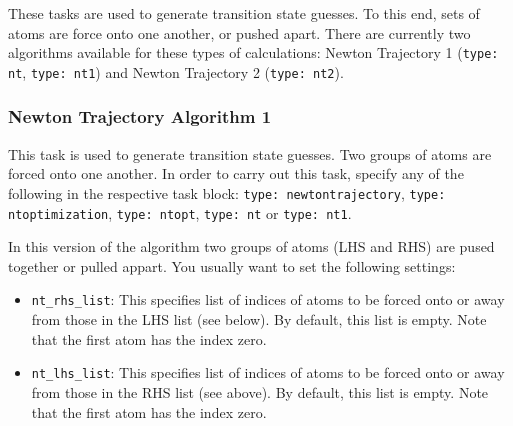 \documentclass[]{tufte-book}
\begin{document}
These tasks are used to generate transition state guesses.
To this end, sets of atoms are force onto one another, or pushed apart.
There are currently two algorithms available for these types of calculations:
Newton Trajectory 1 (\texttt{type: nt}, \texttt{type: nt1}) and Newton Trajectory 2 (\texttt{type: nt2}).

\subsubsection{Newton Trajectory Algorithm 1}

This task is used to generate transition state guesses. Two groups of atoms are forced onto one another.
In order to carry out this task, specify any of the following in the respective task block:
\texttt{type: newtontrajectory}, \texttt{type: ntoptimization}, \texttt{type: ntopt}, \texttt{type: nt} or \texttt{type: nt1}.

In this version of the algorithm two groups of atoms (LHS and RHS) are pused together or pulled appart.
You usually want to set the following settings:
\begin{itemize}
\item \texttt{nt\_rhs\_list}: This specifies list of indices of atoms to be forced onto or away from those
in the LHS list (see below). By default, this list is empty. Note that the first atom has the index zero.
\item \texttt{nt\_lhs\_list}: This specifies list of indices of atoms to be forced onto or away from those
in the RHS list (see above). By default, this list is empty. Note that the first atom has the index zero.
\end{itemize}
\end{document}
